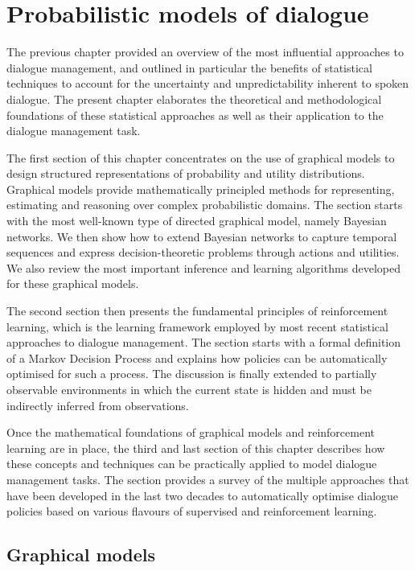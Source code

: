 \chapter{Probabilistic models of dialogue}
\label{chap:probmodelling}

The previous chapter provided an overview of the most influential approaches to dialogue management, and outlined in particular the benefits of statistical techniques to account for the uncertainty and unpredictability inherent to spoken dialogue. The present chapter elaborates the theoretical and methodological foundations of these statistical approaches as well as their application to the dialogue management task. 

The first section of this chapter concentrates on the use of graphical models to design structured representations of probability and utility distributions. Graphical models provide mathematically principled methods for representing, estimating and reasoning over complex probabilistic domains. The section starts with the most well-known type of directed graphical model, namely Bayesian networks.  We then show how to extend Bayesian networks to capture temporal sequences and express decision-theoretic problems through actions and utilities. We also review the most important inference and learning algorithms developed for these graphical models.

The second section then presents the fundamental principles of reinforcement learning, which is the learning framework employed by most recent statistical approaches to dialogue management. The section starts with a formal definition of a Markov Decision Process and explains how policies can be automatically optimised for such a process.  The discussion is finally extended to partially observable environments in which the current state is hidden and must be indirectly inferred from observations.   

Once the mathematical foundations of graphical models and reinforcement learning are in place, the third and last section of this chapter describes how these concepts and techniques can be practically applied to model dialogue management tasks.  The section provides a survey of the multiple approaches that have been developed in the last two decades to automatically optimise dialogue policies based on various flavours of supervised and reinforcement learning.  

\section{Graphical models}
\label{sec:pgm}

